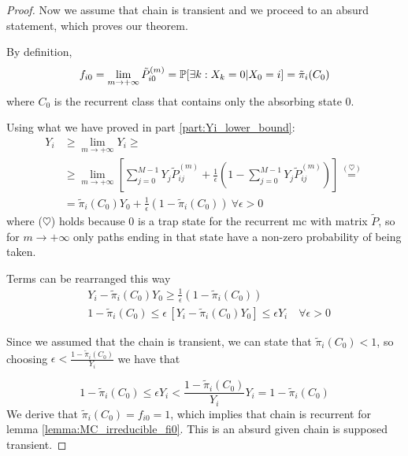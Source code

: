 \begin{proof}
	\proofpart
		Now we assume that chain is transient and we proceed to an absurd statement, which proves our theorem.

		By definition,
		$$ f_{i0} = \lim_{m \to +\infty} \tilde{P}_{i0}^{(m)} = \mathbb{P}[\exists k : X_k = 0 | X_0 = i] = \tilde{\pi}_i(C_0)$$
		where $C_0$ is the recurrent class that contains only the absorbing state 0.

		Using what we have proved in part \ref{part:Yi_lower_bound}:
		\begin{equation}\begin{split}
			Y_i & \ge \lim_{m \to +\infty} Y_i \ge \\
					& \ge \lim_{m \to +\infty} \left[ \sum_{j=0}^{M-1} Y_j \tilde{P}_{ij}^{(m)}
					  + \frac{1}{\epsilon} \left( 1 - \sum_{j=0}^{M-1} Y_j \tilde{P}_{ij}^{(m)} \right) \right] \stackrel{(\heartsuit)}{=} \\
					& = \tilde{\pi}_i(C_0) Y_0 + \frac{1}{\epsilon} \left( 1 - \tilde{\pi}_i(C_0) \right) ~ \forall \epsilon > 0
		\end{split}\end{equation}
		where ($\heartsuit$) holds because 0 is a trap state for the recurrent \gls{mc} with matrix  $\tilde{P}$, so for $m \to +\infty$ only paths ending in that state have a non-zero probability of being taken.

		Terms can be rearranged this way
		\begin{equation*}\begin{split}
			&Y_i - \tilde{\pi}_i(C_0) Y_0 \ge \frac{1}{\epsilon} \left( 1 - \tilde{\pi}_i(C_0) \right) \\
			&1 - \tilde{\pi}_i(C_0) \le \epsilon \, [Y_i - \tilde{\pi}_i(C_0) Y_0] \le \epsilon Y_i \quad\forall \epsilon > 0
		\end{split}\end{equation*}

		Since we assumed that the chain is transient, we can state that $\tilde{\pi}_i(C_0) < 1$, so choosing $\epsilon < \frac{1-\tilde{\pi}_i(C_0)}{Y_i}$ we have that

		\begin{equation*}
			1 - \tilde{\pi}_i(C_0) \le \epsilon Y_i < \frac{1-\tilde{\pi}_i(C_0)}{Y_i} Y_i = 1 - \tilde{\pi}_i(C_0)
		\end{equation*}
		We derive that $\tilde{\pi}_i(C_0) = f_{i0} = 1$, which implies that chain is recurrent for lemma \ref{lemma:MC_irreducible_fi0}. This is an absurd given chain is supposed transient.
	\end{proof}


